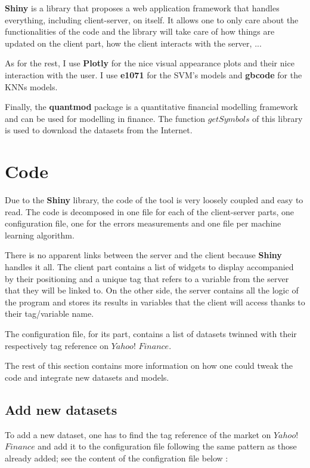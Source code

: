 \documentclass[11pt,a4paper,oneside]{book}
\begin{document}
\textbf{Shiny} is a library that proposes a web application framework that handles everything, including client-server, on itself. It allows one to only care about the functionalities of the code and the library will take care of how things are updated on the client part, how the client interacts with the server, ...

As for the rest, I use \textbf{Plotly} \cite{plotly} for the nice visual appearance plots and their nice interaction with the user. I use \textbf{e1071} \cite{e1071} for the SVM's models and \textbf{gbcode} \cite{gbcode} for the KNNs models.

Finally, the \textbf{quantmod} \cite{quantmod} package is a quantitative financial modelling framework and can be used for modelling in finance. The function $getSymbols$ of this library is used to download the datasets from the Internet.


\section{Code}

Due to the \textbf{Shiny} library, the code of the tool is very loosely coupled and easy to read. The code is decomposed in one file for each of the client-server parts, one configuration file, one for the errors measurements and one file per machine learning algorithm. 

There is no apparent links between the server and the client because \textbf{Shiny} handles it all. The client part contains a list of widgets to display accompanied by their positioning and a unique tag that refers to a variable from the server that they will be linked to. On the other side, the server contains all the logic of the program and stores its results in variables that the client will access thanks to their tag/variable name.

The configuration file, for its part, contains a list of datasets twinned with their respectively tag reference on $Yahoo!$ $Finance$. 

The rest of this section contains more information on how one could tweak the code and integrate new datasets and models.


\subsection{Add new datasets}

To add a new dataset, one has to find the tag reference of the market on $Yahoo!$ $Finance$ and add it to the configuration file following the same pattern as those already added; see the content of the configration file below : 
\end{document}
